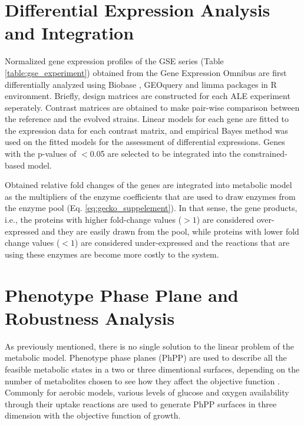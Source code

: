 \section{Differential Expression Analysis and Integration}
Normalized gene expression profiles of the GSE series (Table \ref{table:gse_experiment}) obtained from the Gene Expression Omnibus are first differentially analyzed using Biobase \cite{huber2015orchestrating}, GEOquery \cite{davis2007geoquery} and limma \cite{ritchie2015limma} packages in R environment. Briefly, design matrices are constructed for each ALE experiment seperately. Contrast matrices are obtained to make pair-wise comparison between the reference and the evolved strains. Linear models for each gene are fitted to the expression data for each contrast matrix, and empirical Bayes method was used on the fitted models for the assessment of differential expressions. Genes with the p-values of $<$0.05 are selected to be integrated into the constrained-based model.



Obtained relative fold changes of the genes are integrated into metabolic model as the multipliers of the enzyme coefficients that are used to draw enzymes from the enzyme pool (Eq. \ref{eq:gecko_suppelement}). In that sense, the gene products, i.e., the proteins with higher fold-change values ($>1$) are considered over-expressed and they are easily drawn from the pool, while proteins with lower fold change values ($<1$) are considered under-expressed and the reactions that are using these enzymes are become more costly to the system.



\section{Phenotype Phase Plane and Robustness Analysis}

As previously mentioned, there is no single solution to the linear problem of the metabolic model. Phenotype phase planes (PhPP) are used to describe all the feasible metabolic states in a two or three dimentional surfaces, depending on the number of metabolites chosen to see how they affect the objective function \cite{edwards2002characterizing}. Commonly for aerobic models, various levels of glucose and oxygen availability through their uptake reactions are used to generate PhPP surfaces in three dimension with the objective function of growth.

